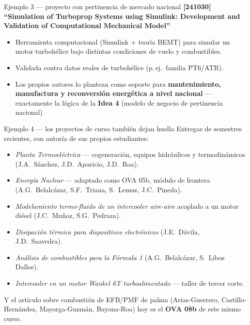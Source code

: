 \documentclass[aspectratio=169]{beamer}
\begin{document}
\begin{frame}{Ejemplo 3 — proyecto con pertinencia de mercado nacional}
  \textbf{[241030] ``Simulation of Turboprop Systems using Simulink: Development and Validation of
  Computational Mechanical Model''}
  \begin{itemize}
    \item Herramienta computacional (Simulink + teoría BEMT) para simular un motor turbohélice bajo
      distintas condiciones de vuelo y combustibles.
    \item Validada contra datos reales de turbohélice (p.\,ej.\ familia PT6/ATR).
    \item Los propios autores lo plantean como soporte para \textbf{mantenimiento, manufactura y
      reconversión energética a nivel nacional} — exactamente la lógica de la \textbf{Idea 4} (modelo de
      negocio de pertinencia nacional).
  \end{itemize}
\end{frame}

\begin{frame}{Ejemplo 4 — los proyectos de curso también dejan huella}
  \footnotesize
  Entregas de semestres recientes, con autoría de sus propios estudiantes:
  \begin{itemize}
    \item \emph{Planta Termoeléctrica} — cogeneración, equipos hidráulicos y termodinámicos (J.A.\ Sánchez,
      J.D.\ Aparicio, J.D.\ Roa).
    \item \emph{Energía Nuclear} — adaptado como OVA 05b, módulo de frontera (A.G.\ Belalcázar, S.F.\ Triana,
      S.\ Lemus, J.C.\ Pineda).
    \item \emph{Modelamiento termo-fluido de un intercooler aire-aire} acoplado a un motor diésel (J.C.\ Muñoz,
      S.G.\ Pedraza).
    \item \emph{Disipación térmica para dispositivos electrónicos} (J.E.\ Dávila, J.D.\ Saavedra).
    \item \emph{Análisis de combustibles para la Fórmula 1} (A.G.\ Belalcázar, S.\ Libos Dallos).
    \item \emph{Intercooler en un motor Wankel 6T turboalimentado} — taller de tercer corte.
  \end{itemize}
  \vspace{0.2cm}
  Y el artículo sobre combustión de EFB/PMF de palma (Arias-Guerrero, Castillo-Hernández, Mayorga-Guzmán,
  Bayona-Roa) hoy es el \textbf{OVA 08b} de este mismo curso.
\end{frame}
\end{document}

